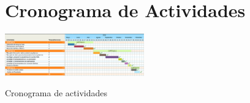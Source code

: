 \section{Cronograma de Actividades}
\begin{table}[!htb]
    \centering
    \includegraphics[angle=90,width=60mm]{Imagenes/cronograma.png}
    \caption{Cronograma de actividades}
    \label{tab:tab1}
\end{table}


